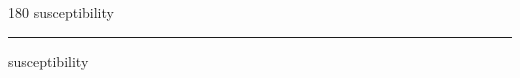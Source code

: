 
\begin{frame}
\begin{center}
\begin{turn}{180}
{\fontsize{2.5cm}{1em}\selectfont susceptibility}
\end{turn}
\vspace{1em}\par  
\hrule
\vspace{1em}\par  
{\fontsize{2.5cm}{1em}\selectfont susceptibility}
\end{center}
\end{frame}
